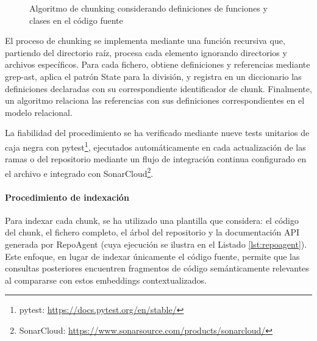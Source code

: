 \begin{figure}[h]
\centering
{}
\caption{Algoritmo de chunking considerando definiciones de funciones y clases en el código fuente}
\label{fig:state_pattern}
\end{figure}
El proceso de chunking se implementa mediante una función recursiva que, partiendo del directorio raíz, procesa cada elemento ignorando directorios y archivos específicos. Para cada fichero, obtiene definiciones y referencias mediante grep-ast, aplica el patrón State para la división, y registra en un diccionario las definiciones declaradas con su correspondiente identificador de chunk. Finalmente, un algoritmo relaciona las referencias con sus definiciones correspondientes en el modelo relacional.

La fiabilidad del procedimiento se ha verificado mediante nueve tests unitarios de caja negra con pytest\footnote{pytest: \url{https://docs.pytest.org/en/stable/}}, ejecutados automáticamente en cada actualización de las ramas  o  del repositorio mediante un flujo de integración continua configurado en el archivo  e integrado con SonarCloud\footnote{SonarCloud: \url{https://www.sonarsource.com/products/sonarcloud/}}.
\paragraph{Procedimiento de indexación}
Para indexar cada chunk, se ha utilizado una plantilla que considera: el código del chunk, el fichero completo, el árbol del repositorio y la documentación API generada por RepoAgent (cuya ejecución se ilustra en el Listado \ref{lst:repoagent}). Este enfoque, en lugar de indexar únicamente el código fuente, permite que las consultas posteriores encuentren fragmentos de código semánticamente relevantes al compararse con estos embeddings contextualizados.

